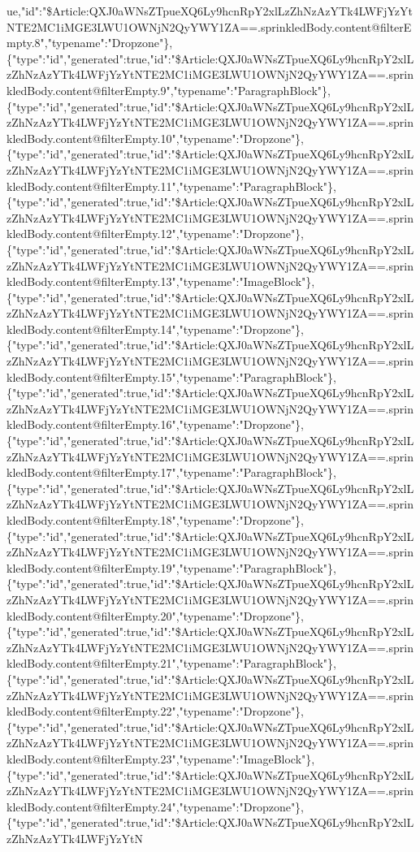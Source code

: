 ue,"id":"\$Article:QXJ0aWNsZTpueXQ6Ly9hcnRpY2xlLzZhNzAzYTk4LWFjYzYtNTE2MC1iMGE3LWU1OWNjN2QyYWY1ZA==.sprinkledBody.content@filterEmpty.8","typename":"Dropzone"\},\{"type":"id","generated":true,"id":"\$Article:QXJ0aWNsZTpueXQ6Ly9hcnRpY2xlLzZhNzAzYTk4LWFjYzYtNTE2MC1iMGE3LWU1OWNjN2QyYWY1ZA==.sprinkledBody.content@filterEmpty.9","typename":"ParagraphBlock"\},\{"type":"id","generated":true,"id":"\$Article:QXJ0aWNsZTpueXQ6Ly9hcnRpY2xlLzZhNzAzYTk4LWFjYzYtNTE2MC1iMGE3LWU1OWNjN2QyYWY1ZA==.sprinkledBody.content@filterEmpty.10","typename":"Dropzone"\},\{"type":"id","generated":true,"id":"\$Article:QXJ0aWNsZTpueXQ6Ly9hcnRpY2xlLzZhNzAzYTk4LWFjYzYtNTE2MC1iMGE3LWU1OWNjN2QyYWY1ZA==.sprinkledBody.content@filterEmpty.11","typename":"ParagraphBlock"\},\{"type":"id","generated":true,"id":"\$Article:QXJ0aWNsZTpueXQ6Ly9hcnRpY2xlLzZhNzAzYTk4LWFjYzYtNTE2MC1iMGE3LWU1OWNjN2QyYWY1ZA==.sprinkledBody.content@filterEmpty.12","typename":"Dropzone"\},\{"type":"id","generated":true,"id":"\$Article:QXJ0aWNsZTpueXQ6Ly9hcnRpY2xlLzZhNzAzYTk4LWFjYzYtNTE2MC1iMGE3LWU1OWNjN2QyYWY1ZA==.sprinkledBody.content@filterEmpty.13","typename":"ImageBlock"\},\{"type":"id","generated":true,"id":"\$Article:QXJ0aWNsZTpueXQ6Ly9hcnRpY2xlLzZhNzAzYTk4LWFjYzYtNTE2MC1iMGE3LWU1OWNjN2QyYWY1ZA==.sprinkledBody.content@filterEmpty.14","typename":"Dropzone"\},\{"type":"id","generated":true,"id":"\$Article:QXJ0aWNsZTpueXQ6Ly9hcnRpY2xlLzZhNzAzYTk4LWFjYzYtNTE2MC1iMGE3LWU1OWNjN2QyYWY1ZA==.sprinkledBody.content@filterEmpty.15","typename":"ParagraphBlock"\},\{"type":"id","generated":true,"id":"\$Article:QXJ0aWNsZTpueXQ6Ly9hcnRpY2xlLzZhNzAzYTk4LWFjYzYtNTE2MC1iMGE3LWU1OWNjN2QyYWY1ZA==.sprinkledBody.content@filterEmpty.16","typename":"Dropzone"\},\{"type":"id","generated":true,"id":"\$Article:QXJ0aWNsZTpueXQ6Ly9hcnRpY2xlLzZhNzAzYTk4LWFjYzYtNTE2MC1iMGE3LWU1OWNjN2QyYWY1ZA==.sprinkledBody.content@filterEmpty.17","typename":"ParagraphBlock"\},\{"type":"id","generated":true,"id":"\$Article:QXJ0aWNsZTpueXQ6Ly9hcnRpY2xlLzZhNzAzYTk4LWFjYzYtNTE2MC1iMGE3LWU1OWNjN2QyYWY1ZA==.sprinkledBody.content@filterEmpty.18","typename":"Dropzone"\},\{"type":"id","generated":true,"id":"\$Article:QXJ0aWNsZTpueXQ6Ly9hcnRpY2xlLzZhNzAzYTk4LWFjYzYtNTE2MC1iMGE3LWU1OWNjN2QyYWY1ZA==.sprinkledBody.content@filterEmpty.19","typename":"ParagraphBlock"\},\{"type":"id","generated":true,"id":"\$Article:QXJ0aWNsZTpueXQ6Ly9hcnRpY2xlLzZhNzAzYTk4LWFjYzYtNTE2MC1iMGE3LWU1OWNjN2QyYWY1ZA==.sprinkledBody.content@filterEmpty.20","typename":"Dropzone"\},\{"type":"id","generated":true,"id":"\$Article:QXJ0aWNsZTpueXQ6Ly9hcnRpY2xlLzZhNzAzYTk4LWFjYzYtNTE2MC1iMGE3LWU1OWNjN2QyYWY1ZA==.sprinkledBody.content@filterEmpty.21","typename":"ParagraphBlock"\},\{"type":"id","generated":true,"id":"\$Article:QXJ0aWNsZTpueXQ6Ly9hcnRpY2xlLzZhNzAzYTk4LWFjYzYtNTE2MC1iMGE3LWU1OWNjN2QyYWY1ZA==.sprinkledBody.content@filterEmpty.22","typename":"Dropzone"\},\{"type":"id","generated":true,"id":"\$Article:QXJ0aWNsZTpueXQ6Ly9hcnRpY2xlLzZhNzAzYTk4LWFjYzYtNTE2MC1iMGE3LWU1OWNjN2QyYWY1ZA==.sprinkledBody.content@filterEmpty.23","typename":"ImageBlock"\},\{"type":"id","generated":true,"id":"\$Article:QXJ0aWNsZTpueXQ6Ly9hcnRpY2xlLzZhNzAzYTk4LWFjYzYtNTE2MC1iMGE3LWU1OWNjN2QyYWY1ZA==.sprinkledBody.content@filterEmpty.24","typename":"Dropzone"\},\{"type":"id","generated":true,"id":"\$Article:QXJ0aWNsZTpueXQ6Ly9hcnRpY2xlLzZhNzAzYTk4LWFjYzYtN